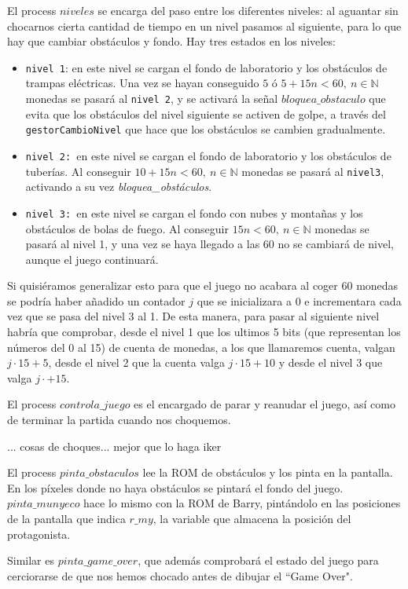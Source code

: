 \documentclass[11pt, a4paper, spanish, openright, twoside]{book}
\begin{document}
El process $niveles$ se encarga del paso entre los diferentes niveles: al aguantar sin chocarnos cierta cantidad de tiempo en un nivel pasamos al siguiente, para lo que hay que cambiar obstáculos y fondo.
Hay tres estados en los niveles:
\begin{itemize}
\item \texttt{nivel 1}: en este nivel se cargan el fondo de laboratorio y los obstáculos de trampas eléctricas. Una vez se hayan conseguido $5$ ó  $5+15n<60,\ n\in\mathbb{N}$  monedas se pasará al \texttt{nivel 2}, y se activará la señal $bloquea\_obstaculo$ que evita que los obstáculos del nivel siguiente se activen de golpe, a través del \texttt{gestorCambioNivel} que hace que los obstáculos se cambien gradualmente. 
\item \texttt{nivel 2: }en este nivel se cargan el fondo de laboratorio y los obstáculos de tuberías. Al conseguir  $10+15n<60,\ n\in\mathbb{N}$ monedas se pasará al \texttt{nivel3}, activando a su vez \textit{bloquea\_obstáculos}.
\item \texttt{nivel 3: }en este nivel se cargan el fondo con nubes y montañas y los obstáculos de bolas de fuego. Al conseguir $15n<60,\ n\in\mathbb{N}$ monedas se pasará al nivel 1, y una vez se haya llegado a las 60 no se cambiará de nivel, aunque el juego continuará. 
\end{itemize}
Si quisiéramos generalizar esto para que el juego no acabara al coger 60 monedas se podría haber añadido un contador $j$ que se inicializara a 0 e incrementara cada vez que se pasa del nivel 3 al 1. De esta manera, para pasar al siguiente nivel habría que comprobar, desde el nivel 1 que los ultimos 5 bits (que representan los números del 0 al 15) de cuenta de monedas, a los que llamaremos cuenta, valgan $j\cdot 15 + 5$, desde el nivel 2 que la cuenta  valga $j\cdot 15 + 10$ y desde el nivel 3 que valga $j\cdot + 15$. 

El process $controla\_juego$ es el encargado de parar y reanudar el juego, así como de terminar la partida cuando nos choquemos.

... cosas de choques... mejor que lo haga iker

El process $pinta\_obstaculos$ lee la ROM de obstáculos y los pinta en la pantalla. En los píxeles donde no haya obstáculos se pintará el fondo del juego. $pinta\_munyeco$ hace lo mismo con la ROM de Barry, pintándolo en las posiciones de la pantalla que indica $r\_my$, la variable que almacena la posición del protagonista.

Similar es $pinta\_game\_over$, que además comprobará el estado del juego para cerciorarse de que nos hemos chocado antes de dibujar el ``Game Over".
\end{document}
